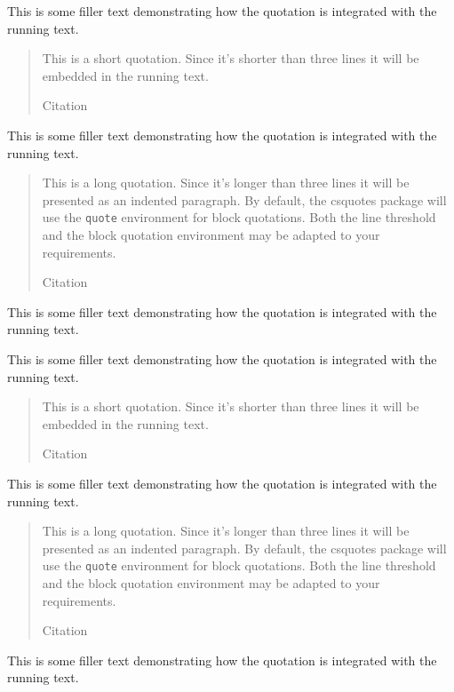 \documentclass[a4paper]{article}
\newcommand*{\example}[1]{%
  \addvspace{\baselineskip}%
  \par\noindent\hspace{-4em}%
  \makebox[3em][r]{\textbf{Ex. #1}}%
  \hspace{1em}\ignorespaces}
\begin{document}

\renewcommand{\mkcitation}[1]{ (#1)} %

\example{2}
This is some filler text demonstrating how the quotation is integrated with
the running text. \blockquote[Citation]{This is a short quotation. Since it's
shorter than three lines it will be embedded in the running text.} This is
some filler text demonstrating how the quotation is integrated with the
running text. \blockquote[Citation]{This is a long quotation. Since it's
longer than three lines it will be presented as an indented paragraph. By
default, the csquotes package will use the \texttt{quote} environment for
block quotations. Both the line threshold and the block quotation environment
may be adapted to your requirements.} This is some filler text demonstrating
how the quotation is integrated with the running text.


\renewcommand{\mkcitation}[1]{%
  \ifblockquote{\footnote{#1.}}{ (#1)}}


\example{3}
This is some filler text demonstrating how the quotation is integrated with
the running text. \blockquote[Citation]{This is a short quotation. Since it's
shorter than three lines it will be embedded in the running text.} This is
some filler text demonstrating how the quotation is integrated with the
running text. \blockquote[Citation]{This is a long quotation. Since it's
longer than three lines it will be presented as an indented paragraph. By
default, the csquotes package will use the \texttt{quote} environment for
block quotations. Both the line threshold and the block quotation environment
may be adapted to your requirements.} This is some filler text demonstrating
how the quotation is integrated with the running text.
\end{document}
